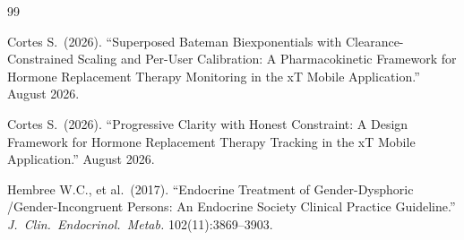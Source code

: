 \documentclass[11pt,a4paper]{article}
\begin{document}
\begin{thebibliography}{99}

Cortes S.\ (2026). ``Superposed Bateman Biexponentials with
Clearance-Constrained Scaling and Per-User Calibration: A Pharmacokinetic
Framework for Hormone Replacement Therapy Monitoring in the xT Mobile
Application.'' August 2026.

Cortes S.\ (2026). ``Progressive Clarity with Honest Constraint: A Design
Framework for Hormone Replacement Therapy Tracking in the xT Mobile
Application.'' August 2026.

Hembree W.C., et al.\ (2017). ``Endocrine Treatment of Gender-Dysphoric
/Gender-Incongruent Persons: An Endocrine Society Clinical Practice
Guideline.'' \emph{J.\ Clin.\ Endocrinol.\ Metab.} 102(11):3869--3903.

\end{thebibliography}
\end{document}
